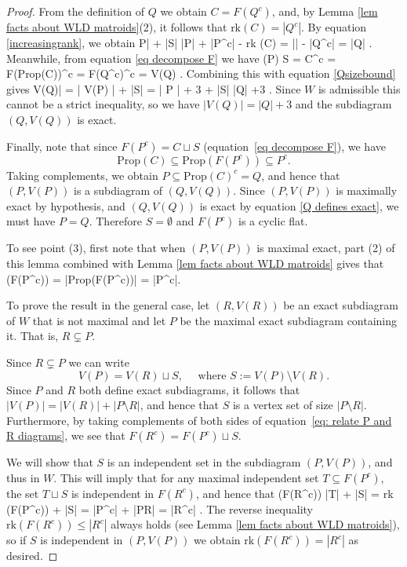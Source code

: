\documentclass[11pt]{article}
\newcommand{\rk}{\textrm{rk} }
\def\ba #1\ea{\begin{align} #1 \end{align}}
\def\bas #1\eas{\begin{align*} #1 \end{align*}}
\newcommand{\cP}{\mathcal{P}}
\newcommand{\Prop}{\textrm{Prop}}
\theoremstyle{remark}
\theoremstyle{definition}
\begin{document}
\begin{proof}
From the definition of $Q$ we obtain $C = F(Q^c)$, and, by Lemma \ref{lem facts about WLD matroids}(2), it follows that $\rk(C) = |Q^c|$. By equation \eqref{increasingrank}, we obtain
\ba |P| + |S| \leq |P| + |P^c| - \rk(C) = |\cP| - |Q^c| = |Q| \;. \label{Qsizebound}\ea 
Meanwhile, from equation \eqref{eq decompose F} we have
\bas V(P) \sqcup S = C^c = F(\Prop(C))^c = F(Q^c)^c = V(Q) \;. \eas
Combining this with equation \eqref{Qsizebound} gives 
\ba |V(Q)| = | V(P) | + |S| = | P | + 3 + |S| \leq |Q| +3 \;. \label{Q defines exact}\ea
Since $W$ is admissible this cannot be a strict inequality, so we have $|V(Q)| = |Q| +3$ and the subdiagram $(Q, V(Q))$ is exact.

Finally, note that since $F(P^c) = C \sqcup S$ (equation~\eqref{eq decompose F}), we have
\[\Prop(C) \subseteq \Prop(F(P^c)) \subseteq P^c.\]
Taking complements, we obtain $P \subseteq \Prop(C)^c = Q$, and hence that $(P, V(P))$ is a subdiagram of $(Q, V(Q))$. Since $(P, V(P))$ is maximally exact by hypothesis, and $(Q, V(Q))$ is exact by equation \eqref{Q defines exact}, we must have $P = Q$. Therefore $S = \emptyset$ and $F(P^c)$ is a cyclic flat.

To see point (3), first note that when $(P,V(P))$ is maximal exact, part (2) of this lemma combined with Lemma \ref{lem facts about WLD matroids} gives that
\bas\rk(F(P^c)) = |\Prop(F(P^c))| = |P^c|.\eas

To prove the result in the general case, let $(R,V(R))$ be an exact subdiagram of $W$ that is not maximal and let $P$ be the maximal exact subdiagram containing it. That is, $R \subsetneq P$.

Since $R \subsetneq P$ we can write 
\begin{equation}\label{eq: relate P and R diagrams}V(P) = V(R) \sqcup S, \quad \text{ where } S := V(P) \setminus V(R).\end{equation}
Since $P$ and $R$ both define exact subdiagrams, it follows that $|V(P)| = |V(R)| + |P \setminus R|$, and hence that $S$ is a vertex set of size $|P \setminus R|$. Furthermore, by taking complements of both sides of equation~\eqref{eq: relate P and R diagrams}, we see that $F(R^c) = F(P^c) \sqcup S$. 

We will show that $S$ is an independent set in the subdiagram $(P, V(P))$, and thus in $W$. This will imply that for any maximal independent set $T \subseteq F(P^c)$, the set $T \sqcup S$ is independent in $F(R^c)$, and hence that 
\bas \rk (F(R^c)) \geq |T| + |S| = \rk (F(P^c)) + |S| = |P^c| + |P\setminus R| = |R^c|  \;.\eas 
The reverse inequality $\rk (F(R^c)) \leq |R^c|$ always holds (see Lemma \ref{lem facts about WLD matroids}), so if $S$ is independent in $(P,V(P))$ we obtain $\rk (F(R^c)) = |R^c|$ as desired.


\end{proof}
\end{document}
